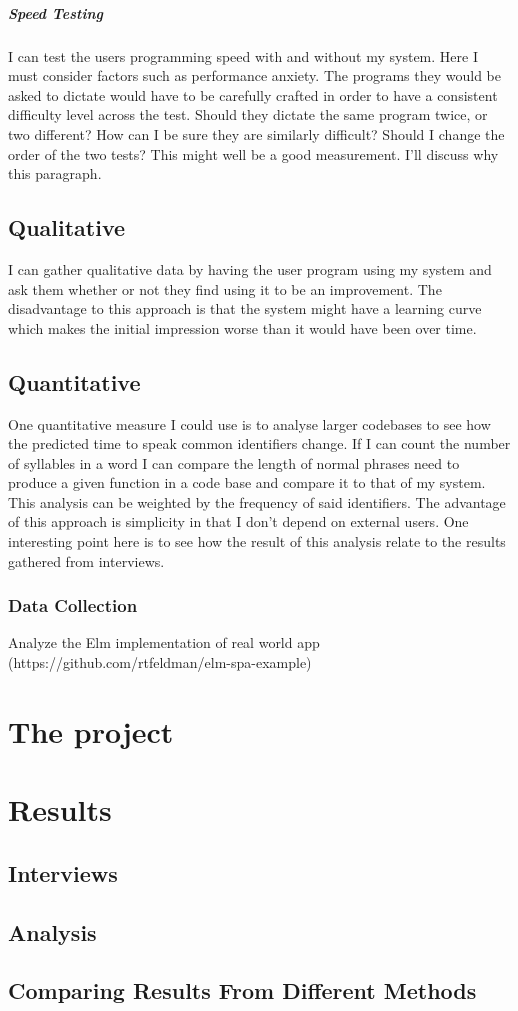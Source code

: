 \documentclass[a4paper,english]{ifimaster}
\begin{document}
\paragraph{Speed Testing}
I can test the users programming speed with and without my system.
Here I must consider factors such as performance anxiety.
The programs they would be asked to dictate would have to be carefully crafted in order to have a consistent difficulty level
across the test. 
Should they dictate the same program twice, or two different? How can I be sure they are similarly difficult?
Should I change the order of the two tests?
This might well be a good measurement. I'll discuss why this paragraph.


\section{Qualitative}
I can gather qualitative data by having the user program using my system and ask them whether or not they find using it to be an improvement.
The disadvantage to this approach is that the system might have a learning curve which makes the initial impression
worse than it would have been over time.

\section{Quantitative}
One quantitative measure I could use is to analyse larger codebases to see how the predicted time to speak common identifiers change.
If I can count the number of syllables in a word I can compare the length of normal phrases need to produce a given function in a code base and compare
it to that of my system. This analysis can be weighted by the frequency of said identifiers.
The advantage of this approach is simplicity in that I don't depend on external users.
One interesting point here is to see how the result of this analysis relate to the results gathered from interviews.
\subsection{Data Collection}
Analyze the Elm implementation of real world app (https://github.com/rtfeldman/elm-spa-example)

\chapter{The project}

\chapter{Results}
\section{Interviews}
\section{Analysis}
\section{Comparing Results From Different Methods}


\backmatter{}
\printbibliography{}
\end{document}
